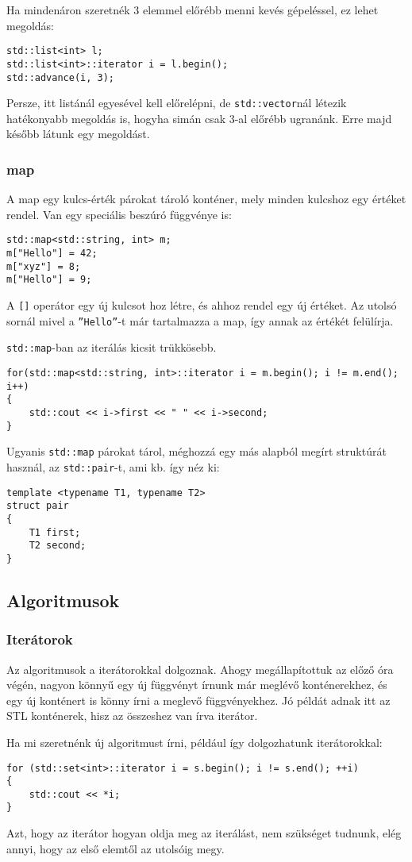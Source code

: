 \documentclass[a4paper,11.5pt]{article}
\begin{document}
	Ha mindenáron szeretnék 3 elemmel előrébb menni kevés gépeléssel, ez lehet megoldás:
\begin{lstlisting}
std::list<int> l;
std::list<int>::iterator i = l.begin();
std::advance(i, 3);
\end{lstlisting}
	Persze, itt listánál egyesével kell előrelépni, de \texttt{std::vector}nál létezik hatékonyabb megoldás is, hogyha simán csak 3-al előrébb ugranánk. Erre majd később látunk egy megoldást.
	\subsubsection{map}
	A map egy kulcs-érték párokat tároló konténer, mely minden kulcshoz egy értéket rendel. Van egy speciális beszúró függvénye is:
\begin{lstlisting}
std::map<std::string, int> m;
m["Hello"] = 42;
m["xyz"] = 8;
m["Hello"] = 9;
\end{lstlisting}
	A \texttt{[]} operátor egy új kulcsot hoz létre, és ahhoz rendel egy új értéket. Az utolsó sornál mivel a \texttt{''Hello''}-t már tartalmazza a map, így annak az értékét felülírja.
	
	\medskip
	\texttt{std::map}-ban az iterálás kicsit trükkösebb.
\begin{lstlisting}
for(std::map<std::string, int>::iterator i = m.begin(); i != m.end(); i++)
{
	std::cout << i->first << " " << i->second;
}
\end{lstlisting}
	Ugyanis \texttt{std::map} párokat tárol, méghozzá egy más alapból megírt struktúrát használ, az \texttt{std::pair}-t, ami kb. így néz ki:
\begin{lstlisting}
template <typename T1, typename T2>
struct pair
{
	T1 first;
	T2 second;
}
\end{lstlisting}
	\subsection{Algoritmusok}
	\subsubsection{Iterátorok}
	Az algoritmusok a iterátorokkal dolgoznak. Ahogy megállapítottuk az előző óra végén, nagyon könnyű egy új függvényt írnunk már meglévő konténerekhez, és egy új konténert is könny írni a meglevő függvényekhez. Jó példát adnak itt az STL konténerek, hisz az összeshez van írva iterátor.
	
	Ha mi szeretnénk új algoritmust írni, például így dolgozhatunk iterátorokkal:
	\begin{lstlisting}
for (std::set<int>::iterator i = s.begin(); i != s.end(); ++i)
{
	std::cout << *i;
}
	\end{lstlisting}
	Azt, hogy az iterátor hogyan oldja meg az iterálást, nem szükséget tudnunk, elég annyi, hogy az első elemtől az utolsóig megy.
	
\end{document}
